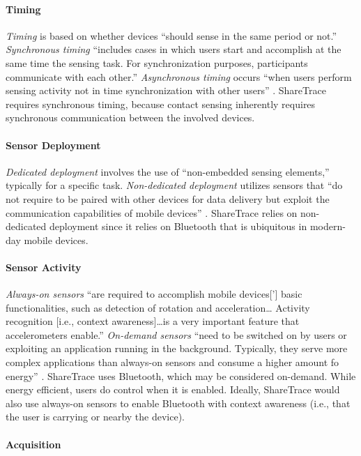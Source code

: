 \paragraph{Timing}

\emph{Timing} is based on whether devices ``should sense in the same period or not.'' \emph{Synchronous timing} ``includes cases in which users start and accomplish at the same time the sensing task. For synchronization purposes, participants communicate with each other.'' \emph{Asynchronous timing} occurs ``when users perform sensing activity not in time synchronization with other users'' \citep{Capponi2019}. ShareTrace requires synchronous timing, because contact sensing inherently requires synchronous communication between the involved devices.

\paragraph{Sensor Deployment}

\emph{Dedicated deployment} involves the use of ``non-embedded sensing elements,'' typically for a specific task. \emph{Non-dedicated deployment} utilizes sensors that ``do not require to be paired with other devices for data delivery but exploit the communication capabilities of mobile devices'' \citep{Capponi2019}. ShareTrace relies on non-dedicated deployment since it relies on Bluetooth that is ubiquitous in modern-day mobile devices.

\paragraph{Sensor Activity}

\emph{Always-on sensors} ``are required to accomplish mobile devices['] basic functionalities, such as detection of rotation and acceleration{\ldots} Activity recognition [i.e., context awareness]{\ldots}is a very important feature that accelerometers enable.'' \emph{On-demand sensors} ``need to be switched on by users or exploiting an application running in the background. Typically, they serve more complex applications than always-on sensors and consume a higher amount fo energy'' \citep{Capponi2019}. ShareTrace uses Bluetooth, which may be considered on-demand. While energy efficient, users do control when it is enabled. Ideally, ShareTrace would also use always-on sensors to enable Bluetooth with context awareness (i.e., that the user is carrying or nearby the device).

\paragraph{Acquisition}

